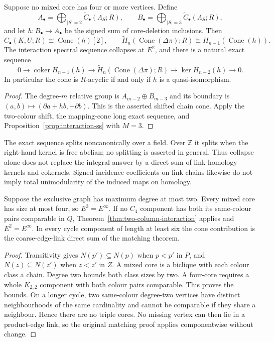 \begin{theorem}
\label{thm:two-column-interaction}
Suppose no mixed core has four or more vertices.  Define
\[
 A_\bullet=\bigoplus_{|S|=2}\widetilde C_\bullet(\Lambda_S;R),
 \qquad
 B_\bullet=\bigoplus_{|S|=3}\widetilde C_\bullet(\Lambda_S;R),
\]
and let $h:B_\bullet\to A_\bullet$ be the signed sum of core-deletion
inclusions.  Then
\[
 C_\bullet(K,U;R)\cong\operatorname{Cone}(h)[2],\qquad
 \widetilde H_n(\operatorname{Cone}(\Delta\pi);R)
 \cong H_{n-1}(\operatorname{Cone}(h)).
\]
The interaction spectral sequence collapses at $E^2$, and there is a
natural exact sequence
\[
 0\longrightarrow\operatorname{coker}H_{n-1}(h)
 \longrightarrow\widetilde H_n(\operatorname{Cone}(\Delta\pi);R)
 \longrightarrow\ker H_{n-2}(h)\longrightarrow0.
\]
In particular the cone is $R$-acyclic if and only if $h$ is a
quasi-isomorphism.
\end{theorem}
\begin{proof}
The degree-$m$ relative group is $A_{m-2}\oplus B_{m-3}$ and its
boundary is $(a,b)\mapsto(\partial a+hb,-\partial b)$.
This is the asserted shifted chain cone.  Apply the two-colour shift,
the mapping-cone long exact sequence, and
Proposition~\ref{prop:interaction-ss} with $M=3$.
\end{proof}

The exact sequence splits noncanonically over a field.  Over $\mathbb Z$
it splits when the right-hand kernel is free abelian; no splitting is
asserted in general.  Thus collapse alone does not replace the integral
answer by a direct sum of link-homology kernels and cokernels.  Signed
incidence coefficients on link chains likewise do not imply total
unimodularity of the induced maps on homology.

\begin{theorem}
\label{thm:degree-two-interaction}
Suppose the exclusive graph has maximum degree at most two.
Every mixed core has size at most four, so $E^3=E^\infty$.
If no $C_4$ component has both its same-colour pairs comparable in $Q$,
Theorem~\ref{thm:two-column-interaction} applies and $E^2=E^\infty$.
In every cycle component of length at least six the cone contribution is
the coarse-edge-link direct sum of the matching theorem.
\end{theorem}
\begin{proof}
Transitivity gives $N(p')\subseteq N(p)$ when $p<p'$ in $P$, and
$N(z)\subseteq N(z')$ when $z<z'$ in $Z$.
A mixed core is a biclique with each colour class a chain.  Degree two
bounds both class sizes by two.  A four-core requires a whole $K_{2,2}$
component with both colour pairs comparable.  This proves the bounds.
On a longer cycle, two same-colour degree-two vertices have distinct
neighbourhoods of the same cardinality and cannot be comparable if they
share a neighbour.  Hence there are no triple cores.  No missing vertex
can then lie in a product-edge link, so the original matching proof
applies componentwise without change.
\end{proof}

